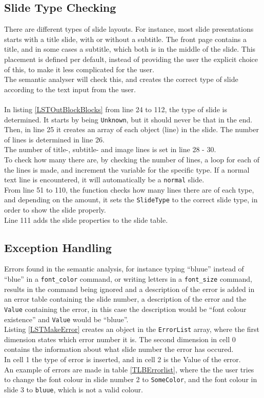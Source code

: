 \subsection{Slide Type Checking}
There are different types of slide layouts. For instance, most slide presentations starts with a title slide, with or without a subtitle. The front page contains a title, and in some cases a subtitle, which both is in the middle of the slide. This placement is defined per default, instead of providing the user the explicit choice of this, to make it less complicated for the user. \\
The semantic analyser will check this, and creates the correct type of slide according to the text input from the user.
\\ \\
In listing \ref{LSTOutBlockBlocks} from line 24 to 112, the type of slide is determined. It starts by being \texttt{Unknown}, but it should never be that in the end. Then, in line 25 it creates an array of each object (line) in the slide. The number of lines is determined in line 26. \\
The number of title-, subtitle- and image lines is set in line 28 - 30. \\
To check how many there are, by checking the number of lines, a loop for each of the lines is made, and increment the variable for the specific type. If a normal text line is encountered, it will automatically be a \texttt{normal} slide. \\
From line 51 to 110, the function checks how many lines there are of each type, and depending on the amount, it sets the \texttt{SlideType} to the correct slide type, in order to show the slide properly. \\
Line 111 adds the slide properties to the slide table.

\subsection{Exception Handling}
Errors found in the semantic analysis, for instance typing ``bluue'' instead of ``blue'' in a \texttt{font\_color} command, or writing letters in a \texttt{font\_size} command, results in the command being ignored and a description of the error is added in an error table containing the slide number, a description of the error and the \texttt{Value} containing the error, in this case the description would be ``font colour existence'' and \texttt{Value} would be ``bluue''.\\
Listing \ref{LSTMakeError} creates an object in the \texttt{ErrorList} array, where the first dimension states which error number it is. The second dimension in cell 0 contains the information about what slide number the error has occured. \\
In cell 1 the type of error is inserted, and in cell 2 is the Value of the error. \\
An example of errors are made in table \ref{TLBErrorlist}, where the the user tries to change the font colour in slide number 2 to \texttt{SomeColor}, and the font colour in slide 3 to \texttt{bluue}, which is not a valid colour. 

